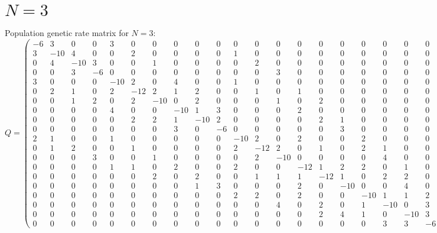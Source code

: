 \documentclass{article}
\theoremstyle{plain}
\theoremstyle{definition}
\begin{document}
\section{$N = 3$}

Population genetic rate matrix for $N = 3$:
\begin{equation}
	Q =
	\left(
	\begin{smallmatrix}
		-6 & 3 & 0 & 0 & 3 & 0 & 0 & 0 & 0 & 0 & 0 & 0 & 0 & 0 & 0 & 0 & 0 & 0 & 0 & 0\\
		3 & -10 & 4 & 0 & 0 & 2 & 0 & 0 & 0 & 0 & 1 & 0 & 0 & 0 & 0 & 0 & 0 & 0 & 0 & 0\\
		0 & 4 & -10 & 3 & 0 & 0 & 1 & 0 & 0 & 0 & 0 & 2 & 0 & 0 & 0 & 0 & 0 & 0 & 0 & 0\\
		0 & 0 & 3 & -6 & 0 & 0 & 0 & 0 & 0 & 0 & 0 & 0 & 3 & 0 & 0 & 0 & 0 & 0 & 0 & 0\\
		3 & 0 & 0 & 0 & -10 & 2 & 0 & 4 & 0 & 0 & 1 & 0 & 0 & 0 & 0 & 0 & 0 & 0 & 0 & 0\\
		0 & 2 & 1 & 0 & 2 & -12 & 2 & 1 & 2 & 0 & 0 & 1 & 0 & 1 & 0 & 0 & 0 & 0 & 0 & 0\\
		0 & 0 & 1 & 2 & 0 & 2 & -10 & 0 & 2 & 0 & 0 & 0 & 1 & 0 & 2 & 0 & 0 & 0 & 0 & 0\\
		0 & 0 & 0 & 0 & 4 & 0 & 0 & -10 & 1 & 3 & 0 & 0 & 0 & 2 & 0 & 0 & 0 & 0 & 0 & 0\\
		0 & 0 & 0 & 0 & 0 & 2 & 2 & 1 & -10 & 2 & 0 & 0 & 0 & 0 & 2 & 1 & 0 & 0 & 0 & 0\\
		0 & 0 & 0 & 0 & 0 & 0 & 0 & 3 & 0 & -6 & 0 & 0 & 0 & 0 & 0 & 3 & 0 & 0 & 0 & 0\\
		2 & 1 & 0 & 0 & 1 & 0 & 0 & 0 & 0 & 0 & -10 & 2 & 0 & 2 & 0 & 0 & 2 & 0 & 0 & 0\\
		0 & 1 & 2 & 0 & 0 & 1 & 0 & 0 & 0 & 0 & 2 & -12 & 2 & 0 & 1 & 0 & 2 & 1 & 0 & 0\\
		0 & 0 & 0 & 3 & 0 & 0 & 1 & 0 & 0 & 0 & 0 & 2 & -10 & 0 & 0 & 0 & 0 & 4 & 0 & 0\\
		0 & 0 & 0 & 0 & 1 & 1 & 0 & 2 & 0 & 0 & 2 & 0 & 0 & -12 & 1 & 2 & 2 & 0 & 1 & 0\\
		0 & 0 & 0 & 0 & 0 & 0 & 2 & 0 & 2 & 0 & 0 & 1 & 1 & 1 & -12 & 1 & 0 & 2 & 2 & 0\\
		0 & 0 & 0 & 0 & 0 & 0 & 0 & 0 & 1 & 3 & 0 & 0 & 0 & 2 & 0 & -10 & 0 & 0 & 4 & 0\\
		0 & 0 & 0 & 0 & 0 & 0 & 0 & 0 & 0 & 0 & 2 & 2 & 0 & 2 & 0 & 0 & -10 & 1 & 1 & 2\\
		0 & 0 & 0 & 0 & 0 & 0 & 0 & 0 & 0 & 0 & 0 & 0 & 4 & 0 & 2 & 0 & 1 & -10 & 0 & 3\\
		0 & 0 & 0 & 0 & 0 & 0 & 0 & 0 & 0 & 0 & 0 & 0 & 0 & 0 & 2 & 4 & 1 & 0 & -10 & 3\\
		0 & 0 & 0 & 0 & 0 & 0 & 0 & 0 & 0 & 0 & 0 & 0 & 0 & 0 & 0 & 0 & 0 & 3 & 3 & -6
	\end{smallmatrix}
	\right)
\end{equation}
\end{document}
